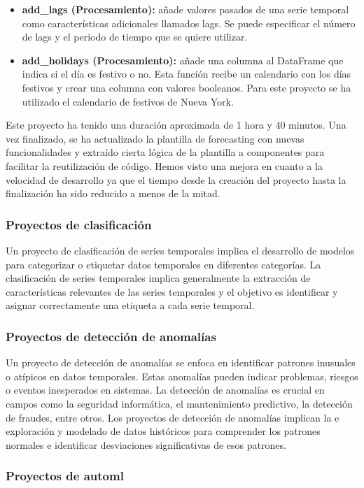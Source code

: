\begin{itemize}
    \item \textbf{add\_lags (Procesamiento):} añade valores pasados de una serie temporal
    como características adicionales llamados lags. Se puede especificar el número de lags
    y el periodo de tiempo que se quiere utilizar.
    \item \textbf{add\_holidays (Procesamiento):} añade una columna al DataFrame que indica
    si el día es festivo o no. Esta función recibe un calendario con los días festivos
    y crear una columna con valores booleanos. Para este proyecto se ha utilizado el calendario
    de festivos de Nueva York.
\end{itemize}

Este proyecto ha tenido una duración aproximada de 1 hora y 40 minutos. Una vez finalizado,
se ha actualizado la plantilla de forecasting con nuevas funcionalidades y extraído cierta
lógica de la plantilla a componentes para facilitar la reutilización de código. Hemos visto
una mejora en cuanto a la velocidad de desarrollo ya que el tiempo desde la creación del proyecto
hasta la finalización ha sido reducido a menos de la mitad. 

\subsubsection{Proyectos de clasificación}
Un proyecto de clasificación de series temporales implica el desarrollo de modelos para 
categorizar o etiquetar datos temporales en diferentes categorías. La clasificación de 
series temporales implica generalmente la extracción de características relevantes 
de las series temporales y el objetivo es identificar y asignar correctamente una 
etiqueta a cada serie temporal.

\subsubsection{Proyectos de detección de anomalías}
Un proyecto de detección de anomalías se enfoca en identificar patrones inusuales o 
atípicos en datos temporales. Estas anomalías pueden indicar problemas, riesgos o 
eventos inesperados en sistemas. La detección de anomalías 
es crucial en campos como la seguridad informática, el mantenimiento predictivo, la 
detección de fraudes, entre otros. Los proyectos de detección de anomalías implican la e
exploración y modelado de datos históricos para comprender los patrones normales e identificar 
desviaciones significativas de esos patrones. 

\subsubsection{Proyectos de automl}
